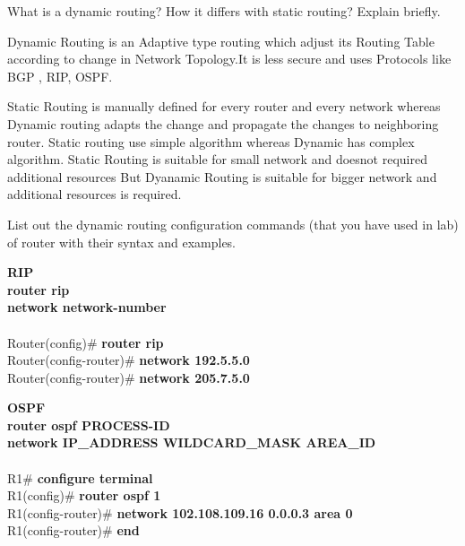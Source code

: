 \documentclass[a4paper,11pt]{article}
\begin{document}
\begin{Q}
    {
        What is a dynamic routing? How it differs with static routing? Explain briefly.
    }
\end{Q}

\begin{A}
    {
        Dynamic Routing is an Adaptive type routing which adjust its Routing Table according to change in Network Topology.It is less secure and uses Protocols like BGP , RIP, OSPF.

        Static Routing is manually defined for every router and every network whereas Dynamic routing adapts the change and propagate the changes to neighboring router. Static routing use simple algorithm whereas Dynamic has complex algorithm. Static Routing is suitable for small network and doesnot required additional resources But Dyanamic Routing is suitable for bigger network and additional resources is required.
    }
\end{A}


\begin{Q}
    {
        List out the dynamic routing configuration commands (that you have used in lab) of router
        with their syntax and examples.
    }
\end{Q}

\begin{A}
    {
        {\large\textbf{RIP}}\\

        \textbf{router rip}\\
        \textbf{network network-number}\\\\

        Router(config)\# \textbf{router rip}\\
        Router(config-router)\# \textbf{network 192.5.5.0}\\
        Router(config-router)\# \textbf{network 205.7.5.0}\\

        \HRule

        {\large\textbf{OSPF}}\\

        \textbf{router ospf PROCESS-ID}\\
        \textbf{ network IP\_ADDRESS WILDCARD\_MASK AREA\_ID}\\\\

        R1\# \textbf{configure terminal}\\
        R1(config)\# \textbf{router ospf 1}\\
        R1(config-router)\# \textbf{network 102.108.109.16 0.0.0.3 area 0}\\
        R1(config-router)\# \textbf{end}\\
    }
\end{A}
\end{document}
